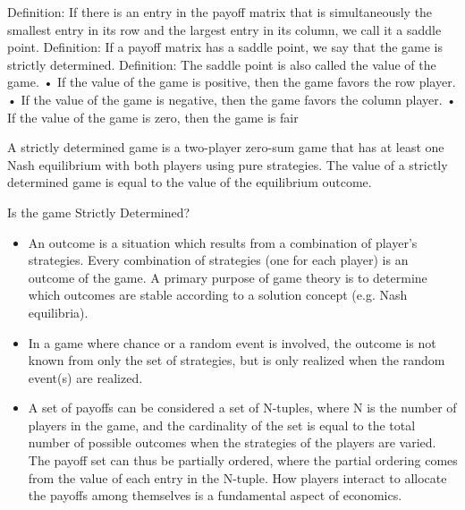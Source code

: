 \documentclass[]{report}
\begin{document}

Definition: If there is an entry in the payoff matrix that is simultaneously the smallest entry in its row and
the largest entry in its column, we call it a saddle point.
Definition: If a payoff matrix has a saddle point, we say that the game is strictly determined.
Definition: The saddle point is also called the value of the game.
• If the value of the game is positive, then the game favors the row player.
• If the value of the game is negative, then the game favors the column player.
• If the value of the game is zero, then the game is fair


A strictly determined game is a two-player zero-sum game that has at least one Nash equilibrium with both players using pure strategies. The value of a strictly determined game is equal to the value of the equilibrium outcome.



Is the game Strictly Determined?


\begin{itemize}
\item An outcome is a situation which results from a combination of player's strategies. Every combination of strategies (one for each player) is an outcome of the game. A primary purpose of game theory is to determine which outcomes are stable according to a solution concept (e.g. Nash equilibria).
\item 
In a game where chance or a random event is involved, the outcome is not known from only the set of strategies, but is only realized when the random event(s) are realized.
\item 
A set of payoffs can be considered a set of N-tuples, where N is the number of players in the game, and the cardinality of the set is equal to the total number of possible outcomes when the strategies of the players are varied. The payoff set can thus be partially ordered, where the partial ordering comes from the value of each entry in the N-tuple. How players interact to allocate the payoffs among themselves is a fundamental aspect of economics.
\end{itemize}
\end{document}
